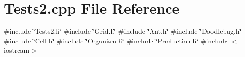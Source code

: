 \section{Tests2.\+cpp File Reference}
\label{Tests2_8cpp}
{\ttfamily \#include \char`\"{}Tests2.\+h\char`\"{}}\newline
{\ttfamily \#include \char`\"{}Grid.\+h\char`\"{}}\newline
{\ttfamily \#include \char`\"{}Ant.\+h\char`\"{}}\newline
{\ttfamily \#include \char`\"{}Doodlebug.\+h\char`\"{}}\newline
{\ttfamily \#include \char`\"{}Cell.\+h\char`\"{}}\newline
{\ttfamily \#include \char`\"{}Organism.\+h\char`\"{}}\newline
{\ttfamily \#include \char`\"{}Production.\+h\char`\"{}}\newline
{\ttfamily \#include $<$iostream$>$}\newline
